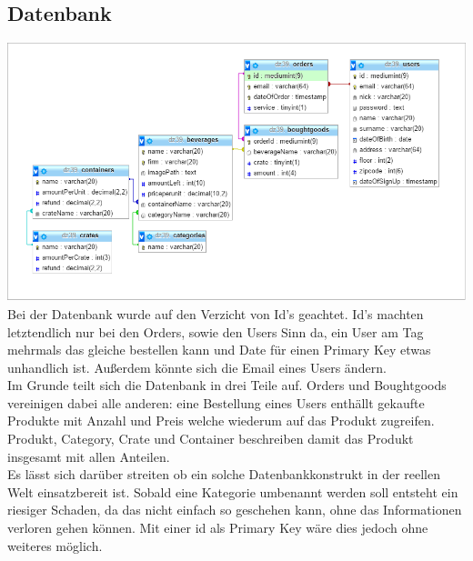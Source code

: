 \documentclass[a4paper, 11pt]{article}
\begin{document}
\subsection{Datenbank}
\includegraphics[width=\textwidth]{databaseDiagram.PNG}
Bei der Datenbank wurde auf den Verzicht von Id's geachtet. Id's machten letztendlich nur bei den Orders, sowie den Users Sinn da, ein User am Tag mehrmals das gleiche bestellen kann und Date für einen Primary Key etwas unhandlich ist. Außerdem könnte sich die Email eines Users ändern. \\
Im Grunde teilt sich die Datenbank in drei Teile auf. Orders und Boughtgoods vereinigen dabei alle anderen: eine Bestellung eines Users enthällt gekaufte Produkte mit Anzahl und Preis welche wiederum auf das Produkt zugreifen. Produkt, Category, Crate und Container beschreiben damit das Produkt insgesamt mit allen Anteilen. \\
Es lässt sich darüber streiten ob ein solche Datenbankkonstrukt in der reellen Welt einsatzbereit ist. Sobald eine Kategorie umbenannt werden soll entsteht ein riesiger Schaden, da das nicht einfach so geschehen kann, ohne das Informationen verloren gehen können. Mit einer id als Primary Key wäre dies jedoch ohne weiteres möglich.
\end{document}
